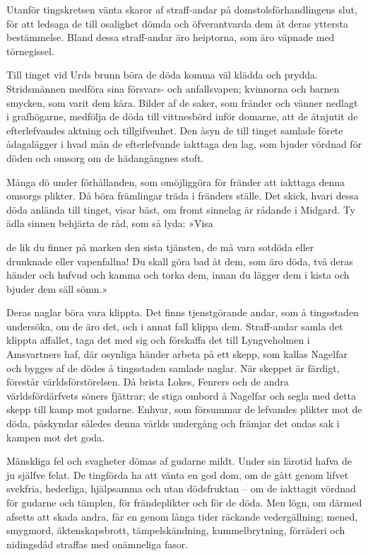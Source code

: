 Utanför tingskretsen vänta skaror af straff-andar på
domstolsförhandlingens slut, för att ledsaga de till osalighet dömda och
öfverantvarda dem åt deras yttersta bestämmelse. Bland dessa
straff-andar äro heiptorna, som äro väpnade med törnegissel.

Till tinget vid Urds brunn böra de döda komma väl klädda och prydda.
Stridsmännen medföra sina försvars- och anfallsvapen; kvinnorna och
barnen smycken, som varit dem kära. Bilder af de saker, som fränder och
vänner nedlagt i grafhögarne, medfölja de döda till vittnesbörd inför
domarne, att de åtnjutit de efterlefvandes aktning och tillgifvenhet.
Den åsyn de till tinget samlade förete ådagalägger i hvad mån de
efterlefvande iakttaga den lag, som bjuder vördnad för döden och omsorg
om de hädangångnes stoft.

Många dö under förhållanden, som omöjliggöra för fränder att iakttaga
denna omsorgs plikter. Då böra främlingar träda i fränders ställe. Det
skick, hvari dessa döda anlända till tinget, visar bäst, om fromt
sinnelag är rådande i Midgard. Ty ädla sinnen behjärta de råd, som så
lyda: »Visa

de lik du finner på marken den sista tjänsten, de må vara sotdöda eller
drunknade eller vapenfallna! Du skall göra bad åt dem, som äro döda, två
deras händer och hufvud och kamma och torka dem, innan du lägger dem i
kista och bjuder dem säll sömn.»

Deras naglar böra vara klippta. Det finns tjenstgörande andar, som å
tingsstaden undersöka, om de äro det, och i annat fall klippa dem.
Straff-andar samla det klippta affallet, taga det med sig och förskaffa
det till Lyngveholmen i Amsvartners haf, där osynliga händer arbeta på
ett skepp, som kallas Nagelfar och bygges af de dödes å tingsstaden
samlade naglar. När skeppet är färdigt, förestår världsförstörelsen. Då
brista Lokes, Fenrers och de andra världsfördärfvets söners fjättrar; de
stiga ombord å Nagelfar och segla med detta skepp till kamp mot gudarne.
Enhvar, som försummar de lefvandes plikter mot de döda, påskyndar
således denna världs undergång och främjar det ondas sak i kampen mot
det goda.

Mänskliga fel och svagheter dömas af gudarne mildt. Under sin lärotid
hafva de ju själfve felat. De tingförda ha att vänta en god dom, om de
gått genom lifvet svekfria, hederliga, hjälpsamma och utan dödsfruktan
-- om de iakttagit vördnad för gudarne och tämplen, för frändeplikter
och för de döda. Men lögn, om därmed afsetts att skada andra, får en
genom långa tider räckande vedergällning; mened, smygmord,
äktenskapsbrott, tämpelskändning, kummelbrytning, förräderi och
nidingsdåd straffas med onämneliga fasor.

